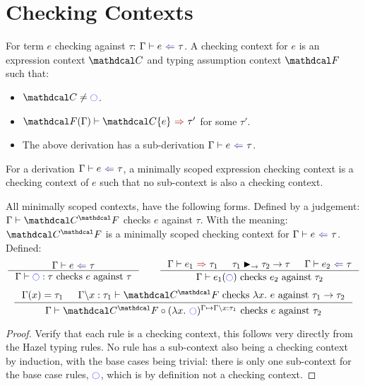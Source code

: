 \section{Checking Contexts}
\label{sec:CheckingContexts}
\begin{definition}
\label{def:CheckingContextAppendix}
For term $e$ checking against $\tau$: $\analysis[\Gamma]{e}{\tau}$. A checking context for $e$ is an expression context $\C$ and typing assumption context $\F$ such that: 
\begin{itemize}
\item $\C \neq \cmark$.
\item $\synthesis[\F(\Gamma)]{\C\{e\}}{\tau'}$ for some $\tau'$.
\item The above derivation has a sub-derivation $\analysis[\Gamma]{e}{\tau}$.
\end{itemize}
\end{definition}
\begin{definition}
For a derivation $\analysis[\Gamma]{e}{\tau}$, a minimally scoped expression checking context is a checking context of $e$ such that no sub-context is also a checking context.
\end{definition}

\begin{proposition}
All minimally scoped contexts, have the following forms. Defined by a judgement: $\Gamma \vdash \C^\F$ checks $e$ against $\tau$. With the meaning: $\C^\F$ is a minimally scoped checking context for $\analysis{e}{\tau}$. Defined:
\[\inference{\analysis{e}{\tau}}{\Gamma \vdash \cmark : \tau \text{ checks } e \text{ against } \tau} \qquad \inference{\synthesis{e_1}{\tau_1} & \tau_1 \funmatch \tau_2 \to \tau & \analysis{e_2}{\tau}}{\Gamma \vdash e_1(\cmark) \text{ checks } e_2 \text{ against } \tau_2}\]
\[\inference{\Gamma(x) = \tau_1 & \Gamma\backslash x:\tau_1 \vdash \C^\F \text{ checks } \lambda x.\ e \text{ against } \tau_1 \to \tau_2}{\Gamma \vdash \C^\F \circ (\lambda x.\ \cmark)^{\Gamma \mapsto \Gamma\backslash x:\tau_1} \text{ checks } e \text{ against } \tau_2}\]
\end{proposition}
\begin{proof}
Verify that each rule is a checking context, this follows very directly from the Hazel typing rules. No rule has a sub-context also being a checking context by induction, with the base cases being trivial: there is only one sub-context for the base case rules, $\cmark$, which is by definition not a checking context.
\end{proof}

